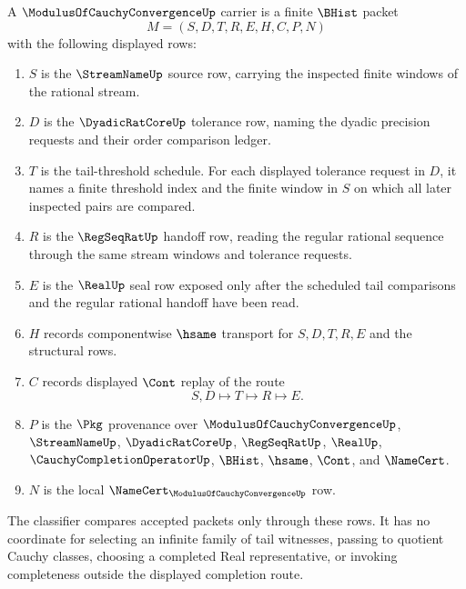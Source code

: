 \begin{definition}
\label{def:modulus-of-cauchy-convergence-carrier}
A $\ModulusOfCauchyConvergenceUp$ carrier is a finite $\BHist$ packet
$$
M=(S,D,T,R,E,H,C,P,N)
$$
with the following displayed rows:
\begin{enumerate}
\item $S$ is the $\StreamNameUp$ source row, carrying the inspected finite windows of the rational stream.
\item $D$ is the $\DyadicRatCoreUp$ tolerance row, naming the dyadic precision requests and their order comparison ledger.
\item $T$ is the tail-threshold schedule. For each displayed tolerance request in $D$, it names a finite threshold index and the finite window in $S$ on which all later inspected pairs are compared.
\item $R$ is the $\RegSeqRatUp$ handoff row, reading the regular rational sequence through the same stream windows and tolerance requests.
\item $E$ is the $\RealUp$ seal row exposed only after the scheduled tail comparisons and the regular rational handoff have been read.
\item $H$ records componentwise $\hsame$ transport for $S,D,T,R,E$ and the structural rows.
\item $C$ records displayed $\Cont$ replay of the route
$$
S,D \longmapsto T \longmapsto R \longmapsto E .
$$
\item $P$ is the $\Pkg$ provenance over $\ModulusOfCauchyConvergenceUp$, $\StreamNameUp$, $\DyadicRatCoreUp$, $\RegSeqRatUp$, $\RealUp$, $\CauchyCompletionOperatorUp$, $\BHist$, $\hsame$, $\Cont$, and $\NameCert$.
\item $N$ is the local $\NameCert_{\ModulusOfCauchyConvergenceUp}$ row.
\end{enumerate}
The classifier compares accepted packets only through these rows. It has no coordinate for selecting an infinite family of tail witnesses, passing to quotient Cauchy classes, choosing a completed Real representative, or invoking completeness outside the displayed completion route.
\end{definition}

